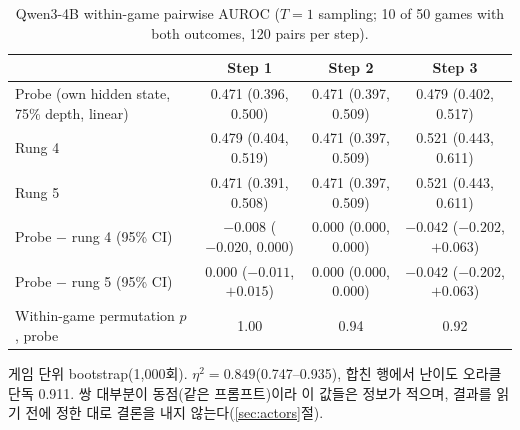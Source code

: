 \begin{table}[htbp]
\centering\small
\caption{Qwen3-4B within-game pairwise AUROC ($T = 1$ sampling; 10 of 50 games with both outcomes, 120 pairs per step).}\label{tab:a3}
\begin{tabularx}{\linewidth}{@{}Lccc@{}}
\toprule
 & Step 1 & Step 2 & Step 3 \\
\midrule
Probe (own hidden state, 75\% depth, linear) & 0.471 (0.396, 0.500) & 0.471 (0.397, 0.509) & 0.479 (0.402, 0.517) \\
Rung 4 & 0.479 (0.404, 0.519) & 0.471 (0.397, 0.509) & 0.521 (0.443, 0.611) \\
Rung 5 & 0.471 (0.391, 0.508) & 0.471 (0.397, 0.509) & 0.521 (0.443, 0.611) \\
Probe $-$ rung 4 (95\% CI) & $-0.008$ ($-0.020$, 0.000) & 0.000 (0.000, 0.000) & $-0.042$ ($-0.202$, $+0.063$) \\
Probe $-$ rung 5 (95\% CI) & 0.000 ($-0.011$, $+0.015$) & 0.000 (0.000, 0.000) & $-0.042$ ($-0.202$, $+0.063$) \\
Within-game permutation $p$, probe & 1.00 & 0.94 & 0.92 \\
\bottomrule
\end{tabularx}
\par\smallskip\raggedright\footnotesize
게임 단위 bootstrap(1,000회). $\eta^2 = 0.849$(0.747--0.935), 합친 행에서 난이도 오라클 단독 0.911. 쌍 대부분이 동점(같은 프롬프트)이라 이 값들은 정보가 적으며, 결과를 읽기 전에 정한 대로 결론을 내지 않는다(\ref{sec:actors}절).
\end{table}
